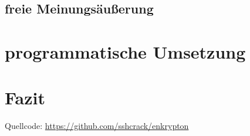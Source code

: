 \documentclass[a4paper,ngerman, headheight=28pt,12pt]{scrartcl}
\begin{document}
\subsection{freie Meinungsäußerung}

\section{programmatische Umsetzung}

\section{Fazit}

\pagebreak
\nolinenumbers{}
\printbibliography[notkeyword={figure}]
\printbibliography[heading=subbibliography,title={Anhang},keyword={figure}]
Quellcode: \href{https://github.com/sshcrack/enkrypton}{https://github.com/sshcrack/enkrypton}
\end{document}
